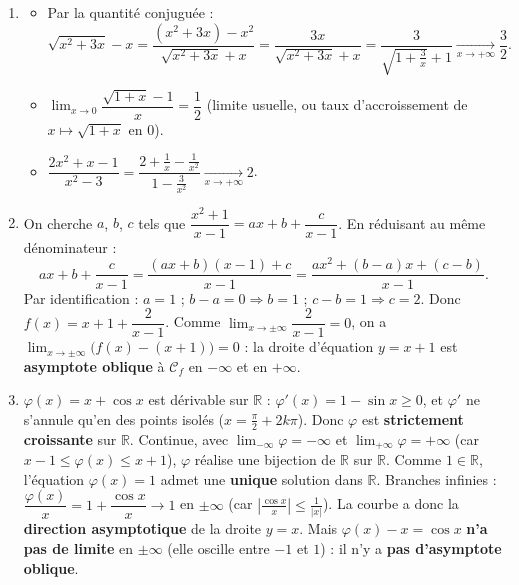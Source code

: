 \documentclass[11pt]{article}
\begin{document}
\begin{corrige}
\begin{enumerate}
\item \begin{itemize}
\item Par la quantité conjuguée :
\[ \sqrt{x^2+3x}-x=\frac{(x^2+3x)-x^2}{\sqrt{x^2+3x}+x}=\frac{3x}{\sqrt{x^2+3x}+x}=\frac{3}{\sqrt{1+\frac{3}{x}}+1}\xrightarrow[x\to+\infty]{}\frac{3}{2}. \]
\item $\lim_{x\to 0}\dfrac{\sqrt{1+x}-1}{x}=\dfrac{1}{2}$ (limite usuelle, ou taux d'accroissement de $x\mapsto\sqrt{1+x}$ en $0$).
\item $\dfrac{2x^2+x-1}{x^2-3}=\dfrac{2+\frac{1}{x}-\frac{1}{x^2}}{1-\frac{3}{x^2}}\xrightarrow[x\to+\infty]{}2$.
\end{itemize}

\item On cherche $a$, $b$, $c$ tels que $\dfrac{x^2+1}{x-1}=ax+b+\dfrac{c}{x-1}$. En réduisant au même dénominateur :
\[ ax+b+\frac{c}{x-1}=\frac{(ax+b)(x-1)+c}{x-1}=\frac{ax^2+(b-a)x+(c-b)}{x-1}. \]
Par identification : $a=1$ ; $b-a=0\Rightarrow b=1$ ; $c-b=1\Rightarrow c=2$.
Donc $f(x)=x+1+\dfrac{2}{x-1}$.
Comme $\lim_{x\to\pm\infty}\dfrac{2}{x-1}=0$, on a $\lim_{x\to\pm\infty}\big(f(x)-(x+1)\big)=0$ : la droite d'équation $y=x+1$ est \textbf{asymptote oblique} à $\mathcal{C}_f$ en $-\infty$ et en $+\infty$.

\item $\varphi(x)=x+\cos x$ est dérivable sur $\mathbb{R}$ : $\varphi'(x)=1-\sin x\ge 0$, et $\varphi'$ ne s'annule qu'en des points isolés ($x=\frac{\pi}{2}+2k\pi$). Donc $\varphi$ est \textbf{strictement croissante} sur $\mathbb{R}$. Continue, avec $\lim_{-\infty}\varphi=-\infty$ et $\lim_{+\infty}\varphi=+\infty$ (car $x-1\le\varphi(x)\le x+1$), $\varphi$ réalise une bijection de $\mathbb{R}$ sur $\mathbb{R}$.
Comme $1\in\mathbb{R}$, l'équation $\varphi(x)=1$ admet une \textbf{unique} solution dans $\mathbb{R}$.
Branches infinies : $\dfrac{\varphi(x)}{x}=1+\dfrac{\cos x}{x}\to 1$ en $\pm\infty$ (car $\left|\frac{\cos x}{x}\right|\le\frac{1}{|x|}$). La courbe a donc la \textbf{direction asymptotique} de la droite $y=x$. Mais $\varphi(x)-x=\cos x$ \textbf{n'a pas de limite} en $\pm\infty$ (elle oscille entre $-1$ et $1$) : il n'y a \textbf{pas d'asymptote oblique}.
\end{enumerate}
\end{corrige}
\end{document}
